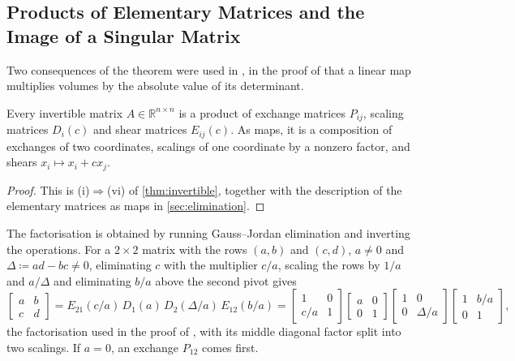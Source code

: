 \subsection{Products of Elementary Matrices and the Image of a Singular Matrix}

Two consequences of the theorem were used in , in the proof of  that a linear map multiplies volumes by the absolute value of its determinant.

\begin{corollary}
\label{cor:elementary-product}
Every invertible matrix $A\in\mathbb R^{n\times n}$ is a product of exchange matrices $P_{ij}$, scaling matrices $D_i(c)$ and shear matrices $E_{ij}(c)$. As maps, it is a composition of exchanges of two coordinates, scalings of one coordinate by a nonzero factor, and shears $x_i\mapsto x_i+cx_j$.
\end{corollary}

\begin{proof}
This is (i)$\Rightarrow$(vi) of \cref{thm:invertible}, together with the description of the elementary matrices as maps in \cref{sec:elimination}.
\end{proof}

The factorisation is obtained by running Gauss--Jordan elimination and inverting the operations. For a $2\times2$ matrix with the rows $(a,b)$ and $(c,d)$, $a\ne0$ and $\Delta\coloneqq ad-bc\ne0$, eliminating $c$ with the multiplier $c/a$, scaling the rows by $1/a$ and $a/\Delta$ and eliminating $b/a$ above the second pivot gives
\[
\begin{bmatrix}a&b\\c&d\end{bmatrix}=E_{21}(c/a)\,D_1(a)\,D_2(\Delta/a)\,E_{12}(b/a)
=\begin{bmatrix}1&0\\c/a&1\end{bmatrix}\begin{bmatrix}a&0\\0&1\end{bmatrix}\begin{bmatrix}1&0\\0&\Delta/a\end{bmatrix}\begin{bmatrix}1&b/a\\0&1\end{bmatrix},
\]
the factorisation used in the proof of , with its middle diagonal factor split into two scalings. If $a=0$, an exchange $P_{12}$ comes first.

